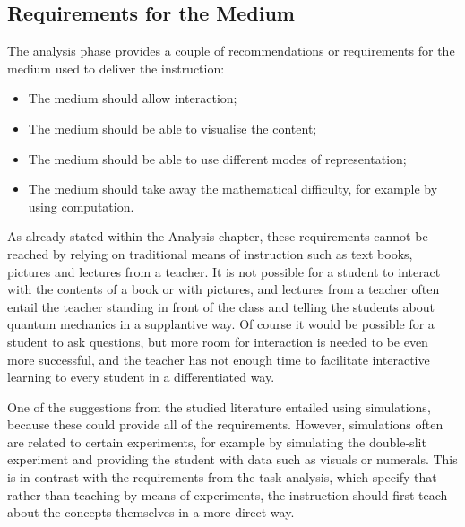 \documentclass[11pt,twoside]{report} %
\begin{document}
\subsection{Requirements for the Medium}

The analysis phase provides a couple of recommendations or requirements for the medium used to deliver the instruction:

\begin{itemize}
\item The medium should allow interaction;
\item The medium should be able to visualise the content;
\item The medium should be able to use different modes of representation;
\item The medium should take away the mathematical difficulty, for example by using computation.
\end{itemize}

As already stated within the Analysis chapter, these requirements cannot be reached by relying on traditional means of instruction such as text books, pictures and lectures from a teacher. It is not possible for a student to interact with the contents of a book or with pictures, and lectures from a teacher often entail the teacher standing in front of the class and telling the students about quantum mechanics in a supplantive way. Of course it would be possible for a student to ask questions, but more room for interaction is needed to be even more successful, and the teacher has not enough time to facilitate interactive learning to every student in a differentiated way.

One of the suggestions from the studied literature entailed using simulations, because these could provide all of the requirements. However, simulations often are related to certain experiments, for example by simulating the double-slit experiment and providing the student with data such as visuals or numerals. This is in contrast with the requirements from the task analysis, which specify that rather than teaching by means of experiments, the instruction should first teach about the concepts themselves in a more direct way.
\end{document}
